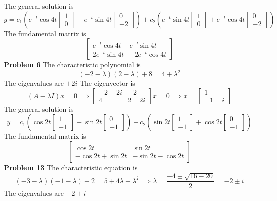 The general solution is
\[
    y = c_1\left(e^{-t}\cos 4t \begin{bmatrix} 1 \\ 0 \end{bmatrix} 
          - e^{-t}\sin 4t \begin{bmatrix} 0 \\ -2 \end{bmatrix}\right) +
        c_2\left(e^{-t}\sin 4t \begin{bmatrix} 1 \\ 0 \end{bmatrix} 
          + e^{-t}\cos 4t \begin{bmatrix} 0 \\ -2 \end{bmatrix}\right) 
\]
The fundamental matrix is 
\[
    \begin{bmatrix}
        e^{-t}\cos 4t & e^{-t}\sin 4t \\
        2e^{-t}\sin 4t & -2e^{-t}\cos 4t
    \end{bmatrix}
\]
\textbf{Problem 6}
The characteristic polynomial is 
\[
    (-2-\lambda)(2-\lambda) + 8
    = 4 + \lambda^2
\]
The eigenvalues are $\pm 2i$
The eigenvector is 
\[
    (A-\lambda I)x=0 \implies 
    \begin{bmatrix}
        -2-2i & -2 \\
        4 & 2-2i
    \end{bmatrix} x = 0 \implies
    x = 
    \begin{bmatrix}
        1 \\ -1-i
    \end{bmatrix}
\]
The general solution is 
\[
    y = c_1\left(\cos 2t \begin{bmatrix} 1 \\ -1 \end{bmatrix} 
          - \sin 2t \begin{bmatrix} 0 \\ -1 \end{bmatrix}\right) +
        c_2\left(\sin 2t \begin{bmatrix} 1 \\ -1 \end{bmatrix} 
          + \cos 2t \begin{bmatrix} 0 \\ -1 \end{bmatrix}\right) 
\]
The fundamental matrix is 
\[
    \begin{bmatrix}
        \cos 2t & \sin 2t \\
        -\cos 2t + \sin 2t & -\sin 2t -\cos 2t
    \end{bmatrix}
\]
\textbf{Problem 13}
The characteristic equation is
\[
    (-3-\lambda)(-1-\lambda) + 2
    = 5 + 4\lambda + \lambda^2
    \implies \lambda =
    \frac{-4 \pm \sqrt{16-20}}{2} =
    -2 \pm i
\]
The eigenvalues are $-2 \pm i$ 

